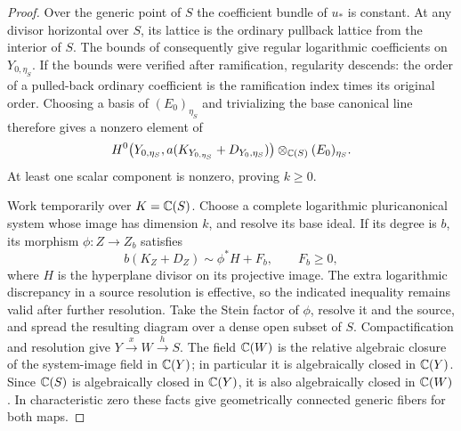 

\begin{proof}
Over the generic point of \(S\) the coefficient bundle of \(u_*\) is
constant.  At any divisor horizontal over \(S\), its lattice is the
ordinary pullback lattice from the interior of \(S\).  The bounds of
 consequently give regular logarithmic
coefficients on \(Y_{0,\eta_S}\).  If the bounds were verified after
ramification, regularity descends: the order of a pulled-back ordinary
coefficient is the ramification index times its original order.
Choosing a basis of \((E_0)_{\eta_S}\) and trivializing the base
canonical line therefore gives a nonzero element of
\[
 H^0\bigl(Y_{0,\eta_S},a(K_{Y_{0,\eta_S}}+D_{Y_0,\eta_S})\bigr)
       \otimes_{\mathbb C(S)}(E_0)_{\eta_S}.
\]
At least one scalar component is nonzero, proving \(k\ge0\).

Work temporarily over \(K=\mathbb C(S)\).  Choose a complete logarithmic
pluricanonical system whose image has dimension \(k\), and resolve its
base ideal.  If its degree is \(b\), its morphism \(\phi:Z\to Z_b\)
satisfies
\begin{equation}\label{eq:iitaka-movable-system}
 b(K_Z+D_Z)\sim\phi^*H+F_b,
 \qquad F_b\ge0,
\end{equation}
where \(H\) is the hyperplane divisor on its projective image.
The extra logarithmic discrepancy in a source resolution is effective,
so the indicated inequality remains valid after further resolution.
Take the Stein factor of \(\phi\), resolve it and the source, and
spread the resulting diagram over a dense open subset of \(S\).
Compactification and resolution give \(Y\xrightarrow{x}W
\xrightarrow{h}S\).  The field \(\mathbb C(W)\) is the relative algebraic
closure of the system-image field in \(\mathbb C(Y)\); in particular it is
algebraically closed in \(\mathbb C(Y)\).  Since \(\mathbb C(S)\) is algebraically
closed in \(\mathbb C(Y)\), it is also algebraically closed in \(\mathbb C(W)\).
In characteristic zero these facts give geometrically connected
generic fibers for both maps.


\end{proof}
